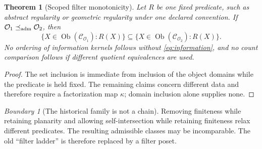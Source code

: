 \documentclass[11pt,a4paper]{article}
\theoremstyle{definition}
\theoremstyle{plain}
\newtheorem{theorem}[definition]{Theorem}
\theoremstyle{remark}
\newtheorem{warning}[definition]{Boundary}
\newcommand{\Ob}{\operatorname{Ob}}
\newcommand{\Ccal}{\mathcal C}
\newcommand{\Ocal}{\mathcal O}
\begin{document}
\begin{theorem}[Scoped filter monotonicity]
\label{thm:filter}
Let \(R\) be one fixed predicate, such as abstract regularity or
geometric regularity under one declared convention.  If
\(\Ocal_1\preceq_{\rm adm}\Ocal_2\), then
\[
\{X\in\Ob(\Ccal_{\Ocal_1}):R(X)\}
\subseteq
\{X\in\Ob(\Ccal_{\Ocal_2}):R(X)\}.
\]
No ordering of information kernels follows without
\cref{eq:information}, and no count comparison follows if different
quotient equivalences are used.
\end{theorem}

\begin{proof}
The set inclusion is immediate from inclusion of the object domains
while the predicate is held fixed.  The remaining claims concern
different data and therefore require a factorization map
\(\kappa\); domain inclusion alone supplies none.
\end{proof}

\begin{warning}[The historical family is not a chain]
Removing finiteness while retaining planarity and allowing
self-intersection while retaining finiteness relax different
predicates.  The resulting admissible classes may be incomparable.
The old ``filter ladder'' is therefore replaced by a filter poset.
\end{warning}

\begin{center}
\end{center}
\end{document}
